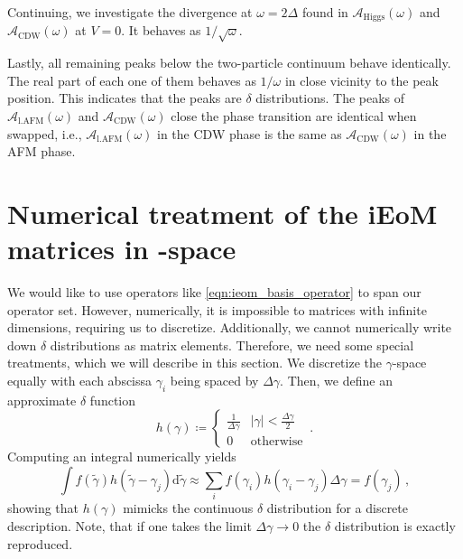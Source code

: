 \documentclass[
    reprint, 
    aps,
    preprintnumbers,
    twocolumn,
    prb,
    superscriptaddress
]{revtex4-2}
\newcommand{\spectral}[1]{\mathcal{A}_\text{#1}  (\omega)}
\def\hmath$#1${\texorpdfstring{{\rmfamily\textit{#1}}}{#1}}
\begin{document}
Continuing, we investigate the divergence at $\omega = 2\Delta$ found in $\spectral{Higgs}$ and $\spectral{CDW}$ at $V=0$. It behaves as $1/\sqrt{\omega}$.

Lastly, all remaining peaks below the two-particle continuum behave identically.
The real part of each one of them behaves as $1/\omega$ in close vicinity to the peak position.
This indicates that the peaks are $\delta$ distributions.
The peaks of $\spectral{l.AFM}$ and $\spectral{CDW}$ close the phase transition are identical when swapped, 
i.e., $\spectral{l.AFM}$ in the CDW phase is the same as $\spectral{CDW}$ in the AFM phase.

\section{Numerical treatment of the iEoM matrices in \hmath $\gamma$-space}
\label{sec:numerical_ieom}

We would like to use operators like \eqref{eqn:ieom_basis_operator} to span our operator set.
However, numerically, it is impossible to matrices with infinite dimensions, requiring us to discretize.
Additionally, we cannot numerically write down $\delta$ distributions as matrix elements. Therefore, we need some special treatments, which we will describe in this section.
We discretize the $\gamma$-space equally with each abscissa $\gamma_i$ being spaced by $\Delta \gamma$.
Then, we define an approximate $\delta$ function
\begin{equation}
    h(\gamma) \coloneqq \begin{cases}
        \frac{1}{\Delta \gamma} & |\gamma| < \frac{\Delta \gamma}{2} \\ 0 & \text{otherwise}
    \end{cases}\,.
\end{equation}
Computing an integral numerically yields
\begin{equation}
    \int f(\tilde{\gamma}) h(\tilde{\gamma} - \gamma_j) \mathrm{d} \tilde{\gamma} \approx \sum_i f(\gamma_i) h(\gamma_i - \gamma_j) \Delta \gamma = f(\gamma_j)\,,
\end{equation}
showing that $h(\gamma)$ mimicks the continuous $\delta$ distribution for a discrete description.
Note, that if one takes the limit $\Delta \gamma \to 0$ the $\delta$ distribution is exactly reproduced.
\end{document}

